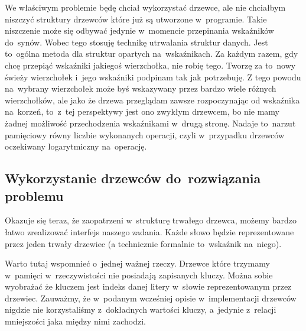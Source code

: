 \documentclass[declaration,shortabstract]{iithesis}
\theoremstyle{definition} \newtheorem{definition}{Definicja}[chapter]
\theoremstyle{plain} \newtheorem{remark}[definition]{Obserwacja}
\theoremstyle{plain} \newtheorem{theorem}[definition]{Twierdzenie}
\theoremstyle{plain} \newtheorem{example}{Przykład}[definition]
\theoremstyle{plain} \newtheorem{lemma}[definition]{Lemat}
\begin{document}
We właściwym problemie będę chciał wykorzystać drzewce, ale nie chciałbym niszczyć struktury drzewców które już są utworzone w~programie. Takie niszczenie może się odbywać jedynie w~momencie przepinania wskaźników do~synów. Wobec tego stosuję technikę utrwalania struktur danych. Jest to~ogólna metoda dla struktur opartych na~wskaźnikach. Za każdym razem, gdy chcę przepiąć wskaźniki jakiegoś wierzchołka, nie robię tego. Tworzę za to~nowy świeży wierzchołek i~jego wskaźniki podpinam tak jak potrzebuję. Z tego powodu na~wybrany wierzchołek może byś wskazywany przez bardzo wiele różnych wierzchołków, ale jako że drzewa przeglądam zawsze rozpoczynając od wskaźnika na~korzeń, to~z~tej perspektywy jest ono zwykłym drzewcem, bo nie mamy żadnej możliwość przechodzenia wskaźnikami w~drugą stronę. Nadaje to~narzut pamięciowy równy liczbie wykonanych operacji, czyli w~przypadku drzewców oczekiwany logarytmiczny na~operację.

\subsection{Wykorzystanie drzewców do~rozwiązania problemu}

Okazuje się teraz, że zaopatrzeni w~strukturę trwałego drzewca, możemy bardzo łatwo zrealizować interfejs naszego zadania. Każde słowo będzie reprezentowane przez jeden trwały drzewiec (a technicznie formalnie to~wskaźnik na~niego). 

Warto tutaj wspomnieć o~jednej ważnej rzeczy. Drzewce które trzymamy w~pamięci w~rzeczywistości nie posiadają zapisanych kluczy. Można sobie wyobrażać że kluczem jest indeks danej litery w~słowie reprezentowanym przez drzewiec. Zauważmy, że w~podanym wcześniej opisie w~implementacji drzewców nigdzie nie korzystaliśmy z~dokładnych wartości kluczy, a~jedynie z~relacji mniejszości jaka między nimi zachodzi.
\end{document}
